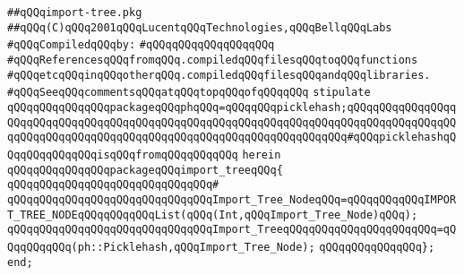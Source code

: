 \label{src/lib/compiler/execution/main/import-tree.pkg}
\verb|##qQQqimport-tree.pkg|\newline
\verb|##qQQq(C)qQQq2001qQQqLucentqQQqTechnologies,qQQqBellqQQqLabs|\newline
\newline
\verb|#qQQqCompiledqQQqby:|\newline
\verb|#qQQqqQQqqQQqqQQqqQQq|\newline
\newline
\newline
\newline
\verb|#qQQqReferencesqQQqfromqQQq.compiledqQQqfilesqQQqtoqQQqfunctions|\newline
\verb|#qQQqetcqQQqinqQQqotherqQQq.compiledqQQqfilesqQQqandqQQqlibraries.|\newline
\verb|#qQQqSeeqQQqcommentsqQQqatqQQqtopqQQqofqQQqqQQq|\newline
\newline
\verb|stipulate|\newline
\verb|qQQqqQQqqQQqqQQqpackageqQQqphqQQq=qQQqqQQqpicklehash;qQQqqQQqqQQqqQQqqQQqqQQqqQQqqQQqqQQqqQQqqQQqqQQqqQQqqQQqqQQqqQQqqQQqqQQqqQQqqQQqqQQqqQQqqQQqqQQqqQQqqQQqqQQqqQQqqQQqqQQqqQQqqQQqqQQqqQQqqQQq#qQQqpicklehashqQQqqQQqqQQqqQQqisqQQqfromqQQqqQQqqQQq|\newline
\verb|herein|\newline
\newline
\verb|qQQqqQQqqQQqqQQqpackageqQQqimport_treeqQQq{|\newline
\verb|qQQqqQQqqQQqqQQqqQQqqQQqqQQqqQQq#|\newline
\verb|qQQqqQQqqQQqqQQqqQQqqQQqqQQqqQQqImport_Tree_NodeqQQq=qQQqqQQqqQQqIMPORT_TREE_NODEqQQqqQQqqQQqList(qQQq(Int,qQQqImport_Tree_Node)qQQq);|\newline
\verb|qQQqqQQqqQQqqQQqqQQqqQQqqQQqqQQqImport_TreeqQQqqQQqqQQqqQQqqQQqqQQq=qQQqqQQqqQQq(ph::Picklehash,qQQqImport_Tree_Node);|\newline
\verb|qQQqqQQqqQQqqQQq};|\newline
\newline
\verb|end;|\newline

